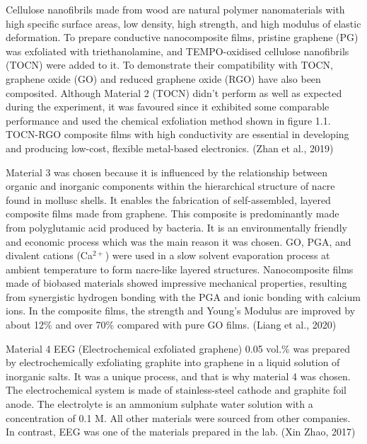 \documentclass[a4paper,12pt]{article}
\numberwithin{equation}{section}
\numberwithin{figure}{section}
\begin{document}
\noindent Cellulose nanofibrils made from wood are natural polymer nanomaterials with high specific surface areas, low density, high strength, and high modulus of elastic deformation. To prepare conductive nanocomposite films, pristine graphene (PG) was exfoliated with triethanolamine, and TEMPO-oxidised cellulose nanofibrils (TOCN) were added to it. To demonstrate their compatibility with TOCN, graphene oxide (GO) and reduced graphene oxide (RGO) have also been composited. Although Material 2 (TOCN) didn't perform as well as expected during the experiment, it was favoured since it exhibited some comparable performance and used the chemical exfoliation method shown in figure 1.1. TOCN-RGO composite films with high conductivity are essential in developing and producing low-cost, flexible metal-based electronics. (Zhan et al., 2019)\vspace{\baselineskip}

\noindent Material 3 was chosen because it is influenced by the relationship between organic and inorganic components within the hierarchical structure of nacre found in mollusc shells. It enables the fabrication of self-assembled, layered composite films made from graphene. This composite is predominantly made from polyglutamic acid produced by bacteria. It is an environmentally friendly and economic process which was the main reason it was chosen. GO, PGA, and divalent cations (Ca$^{2+}$) were used in a slow solvent evaporation process at ambient temperature to form nacre-like layered structures. Nanocomposite films made of biobased materials showed impressive mechanical properties, resulting from synergistic hydrogen bonding with the PGA and ionic bonding with calcium ions. In the composite films, the strength and Young’s Modulus are improved by about 12\% and over 70\% compared with pure GO films. (Liang et al., 2020)\vspace{\baselineskip}

\noindent Material 4 EEG (Electrochemical exfoliated graphene) 0.05 vol.\% was prepared by electrochemically exfoliating graphite into graphene in a liquid solution of inorganic salts. It was a unique process, and that is why material 4 was chosen. The electrochemical system is made of stainless-steel cathode and graphite foil anode. The electrolyte is an ammonium sulphate water solution with a concentration of 0.1 M. All other materials were sourced from other companies. In contrast, EEG was one of the materials prepared in the lab. (Xin Zhao, 2017)\vspace{\baselineskip}
\end{document}
